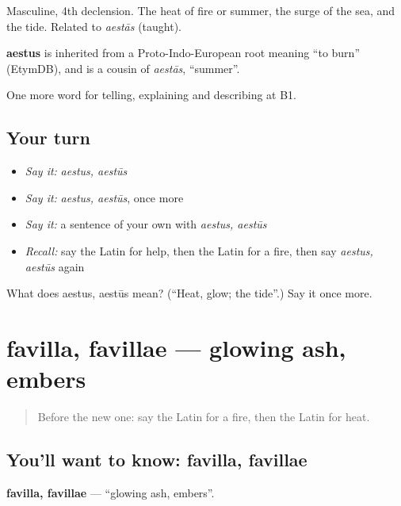 Masculine, 4th declension. The heat of fire or summer, the surge of the sea, and the tide. Related to \emph{aestās} (taught).

\begin{cousinweb}
\textbf{aestus} is inherited from a Proto-Indo-European root meaning \textquotedblleft{}to burn\textquotedblright{} (EtymDB), and is a cousin of \emph{aestās}, \textquotedblleft{}summer\textquotedblright{}.
\end{cousinweb}

\begin{grammarlens}[title={What you've built}]
One more word for telling, explaining and describing at B1.
\end{grammarlens}

\subsection*{Your turn}
\begin{itemize}
\raggedright
  \item \emph{Say it:} \emph{aestus, aestūs}
  \item \emph{Say it:} \emph{aestus, aestūs}, once more
  \item \emph{Say it:} a sentence of your own with \emph{aestus, aestūs}
  \item \emph{Recall:} say the Latin for help, then the Latin for a fire, then say \emph{aestus, aestūs} again
\end{itemize}

\begin{tcolorbox}[breakable,colback=teal!4,colframe=teal!35!black,title={Before you move on}]
What does aestus, aestūs mean? (\textquotedblleft{}Heat, glow; the tide\textquotedblright{}.) Say it once more.
\end{tcolorbox}
\section[favilla, favillae]{favilla, favillae — glowing ash, embers}

\label{lesson:LA-C317-favilla}



\begin{quote}
Before the new one: say the Latin for a fire, then the Latin for heat.
\end{quote}

\subsection*{You'll want to know: favilla, favillae}
\textbf{favilla, favillae} — \textquotedblleft{}glowing ash, embers\textquotedblright{}.


